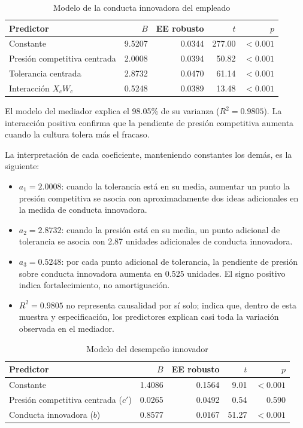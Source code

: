\documentclass[11pt,letterpaper]{article}
\newcommand{\Rdos}{R^{2}}
\begin{document}
\begin{table}[H]
\centering
\caption{Modelo de la conducta innovadora del empleado}
\begin{tabular}{lrrrr}
\toprule
Predictor & $B$ & EE robusto & $t$ & $p$\\
\midrule
Constante & 9.5207 & 0.0344 & 277.00 & $<0.001$\\
Presión competitiva centrada & 2.0008 & 0.0394 & 50.82 & $<0.001$\\
Tolerancia centrada & 2.8732 & 0.0470 & 61.14 & $<0.001$\\
Interacción $X_cW_c$ & 0.5248 & 0.0389 & 13.48 & $<0.001$\\
\bottomrule
\end{tabular}
\end{table}

El modelo del mediador explica el 98.05\% de su varianza ($\Rdos=0.9805$). La interacción positiva confirma que la pendiente de presión competitiva aumenta cuando la cultura tolera más el fracaso.

La interpretación de cada coeficiente, manteniendo constantes los demás, es la siguiente:

\begin{itemize}
\item $a_1=2.0008$: cuando la tolerancia está en su media, aumentar un punto la presión competitiva se asocia con aproximadamente dos ideas adicionales en la medida de conducta innovadora.
\item $a_2=2.8732$: cuando la presión está en su media, un punto adicional de tolerancia se asocia con 2.87 unidades adicionales de conducta innovadora.
\item $a_3=0.5248$: por cada punto adicional de tolerancia, la pendiente de presión sobre conducta innovadora aumenta en 0.525 unidades. El signo positivo indica fortalecimiento, no amortiguación.
\item $\Rdos=0.9805$ no representa causalidad por sí solo; indica que, dentro de esta muestra y especificación, los predictores explican casi toda la variación observada en el mediador.
\end{itemize}

\begin{table}[H]
\centering
\caption{Modelo del desempeño innovador}
\begin{tabular}{lrrrr}
\toprule
Predictor & $B$ & EE robusto & $t$ & $p$\\
\midrule
Constante & 1.4086 & 0.1564 & 9.01 & $<0.001$\\
Presión competitiva centrada ($c'$) & 0.0265 & 0.0492 & 0.54 & 0.590\\
Conducta innovadora ($b$) & 0.8577 & 0.0167 & 51.27 & $<0.001$\\
\bottomrule
\end{tabular}
\end{table}
\end{document}
